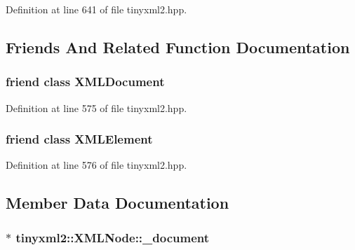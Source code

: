 Definition at line 641 of file tinyxml2.\-hpp.



\subsection{Friends And Related Function Documentation}
\hypertarget{classtinyxml2_1_1_x_m_l_node_a4eee3bda60c60a30e4e8cd4ea91c4c6e}{
\subsubsection[{X\-M\-L\-Document}]{\setlength{\rightskip}{0pt plus 5cm}friend class {\bf X\-M\-L\-Document}\hspace{0.3cm}{\ttfamily [friend]}}}\label{classtinyxml2_1_1_x_m_l_node_a4eee3bda60c60a30e4e8cd4ea91c4c6e}


Definition at line 575 of file tinyxml2.\-hpp.

\hypertarget{classtinyxml2_1_1_x_m_l_node_ac2fba9b6e452829dd892f7392c24e0eb}{
\subsubsection[{X\-M\-L\-Element}]{\setlength{\rightskip}{0pt plus 5cm}friend class {\bf X\-M\-L\-Element}\hspace{0.3cm}{\ttfamily [friend]}}}\label{classtinyxml2_1_1_x_m_l_node_ac2fba9b6e452829dd892f7392c24e0eb}


Definition at line 576 of file tinyxml2.\-hpp.



\subsection{Member Data Documentation}
\hypertarget{classtinyxml2_1_1_x_m_l_node_a8d2d2be0bb6797625551eb0e91f0ff62}{
\subsubsection[{\-\_\-document}]{$\ast$ tinyxml2\-::\-X\-M\-L\-Node\-::\-\_\-document\hspace{0.3cm}{\ttfamily [protected]}}}\label{classtinyxml2_1_1_x_m_l_node_a8d2d2be0bb6797625551eb0e91f0ff62}


